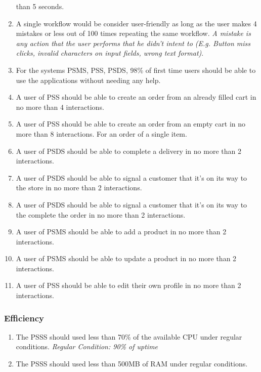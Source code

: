 \begin{enumerate}[label=USE-\arabic*]
    than 5 seconds.
    \item A single workflow would be consider user-friendly as long as the 
    user makes 4 mistakes or less out of 100 times repeating the same workflow. 
    \textit{A mistake is any action that the user performs that he didn’t 
    intent to (E.g. Button miss clicks, invalid characters on input fields, 
    wrong text format)}.
    \item For the systems PSMS, PSS, PSDS, 98\% of first time users should be 
    able to use the applications without needing any help.
    \item A user of PSS should be able to create an order from an already 
    filled cart in no more than 4 interactions.
    \item A user of PSS should be able to create an order from an empty cart 
    in no more than 8 interactions. For an order of a single item.
    \item A user of PSDS should be able to complete a delivery in no more 
    than 2 interactions.
    \item A user of PSDS should be able to signal a customer that it’s on its 
    way to the store in no more than 2 interactions.
    \item A user of PSDS should be able to signal a customer that it’s on its
    way to the complete the order in no more than 2 interactions.
    \item A user of PSMS should be able to add a product in no more 
    than 2 interactions.
    \item A user of PSMS should be able to update a product in no more 
    than 2 interactions.
    \item A user of PSS should be able to edit their own profile in no more 
    than 2 interactions.
\end{enumerate}
\pagebreak
\subsubsection{Efficiency}
\begin{enumerate}[label=EFF-\arabic*]
    \item The PSSS should used less than 70\% of the available CPU under 
    regular conditions. \textit{Regular Condition: 90\% of uptime}
    \item The PSSS should used less than 500MB of RAM under regular conditions.
\end{enumerate}

